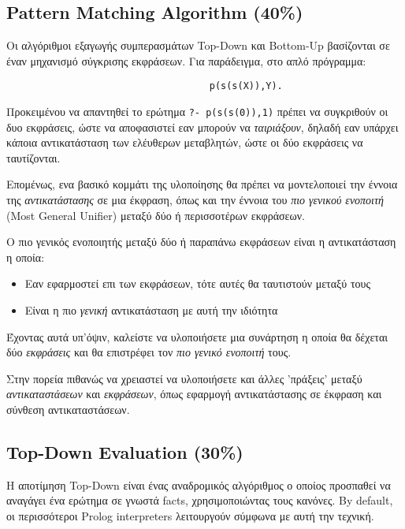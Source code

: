 \documentclass[10pt]{article}
\begin{document}
\subsection*{Pattern Matching Algorithm (40\%)}

Οι αλγόριθμοι εξαγωγής συμπερασμάτων Top-Down και Bottom-Up βασίζονται σε έναν μηχανισμό σύγκρισης εκφράσεων. Για παράδειγμα, στο απλό πρόγραμμα:

\begin{verbatim}
                                    p(s(s(X)),Y).
\end{verbatim}

Προκειμένου να απαντηθεί το ερώτημα \verb|?- p(s(s(0)),1)| πρέπει να συγκριθούν οι δυο εκφράσεις, ώστε να αποφασιστεί εαν μπορούν να \textit{ταιριάξουν}, δηλαδή εαν υπάρχει κάποια αντικατάσταση των ελέυθερων μεταβλητών, ώστε οι δύο εκφράσεις να ταυτίζονται. \

Επομένως, ενα βασικό κομμάτι της υλοποίησης θα πρέπει να μοντελοποιεί την έννοια της \textit{αντικατάστασης} σε μια έκφραση, όπως και την έννοια του \textit{πιο γενικού ενοποιτή} (Most General Unifier) μεταξύ δύο ή περισσοτέρων εκφράσεων.

Ο πιο γενικός ενοποιητής μεταξύ δύο ή παραπάνω εκφράσεων είναι η αντικατάσταση η οποία:
\begin{itemize}
    \item Εαν εφαρμοστεί επι των εκφράσεων, τότε αυτές θα ταυτιστούν μεταξύ τους 
    \item Είναι η πιο \textit{γενική} αντικατάσταση με αυτή την ιδιότητα
\end{itemize}

Έχοντας αυτά υπ'όψιν, καλείστε να υλοποιήσετε μια συνάρτηση η οποία θα δέχεται δύο \textit{εκφράσεις} και  θα επιστρέφει τον \textit{πιο γενικό ενοποιτή} τους.\

Στην πορεία πιθανώς να χρειαστεί να υλοποιήσετε και άλλες 'πράξεις' μεταξύ \textit{αντικαταστάσεων} και \textit{εκφράσεων}, όπως εφαρμογή αντικατάστασης σε έκφραση και σύνθεση αντικαταστάσεων.


\subsection*{Top-Down Evaluation (30\%)}

Η αποτίμηση Top-Down είναι ένας αναδρομικός αλγόριθμος ο οποίος προσπαθεί να αναγάγει ένα ερώτημα σε γνωστά facts, χρησιμοποιώντας τους κανόνες. By default, οι περισσότεροι Prolog interpreters λειτουργούν σύμφωνα με αυτή την τεχνική.\
\end{document}
